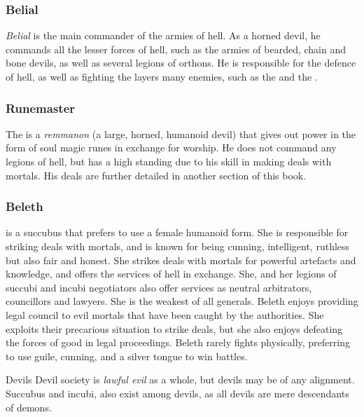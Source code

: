 \subsubsection{Belial}
\label{sec:Belial}

\emph{Belial} is the main commander of the armies of hell. As a horned devil,
he commands all the lesser forces of hell, such as the armies of bearded,
chain and bone devils, as well as several legions of orthons. He is
responsible for the defence of hell, as well as fighting the layers many
enemies, such as the  and the .

\subsubsection{Runemaster}

The  is a \emph{remmanon} (a large, horned, humanoid
devil) that gives out power in the form of soul magic runes in exchange for
worship. He does not command any legions of hell, but has a high standing due
to his skill in making deals with mortals. His deals are further detailed in
another section of this book.

\subsubsection{Beleth}
\label{sec:Beleth}

 is a succubus that prefers to use a female
humanoid form. She is responsible for striking deals with mortals, and is
known for being cunning, intelligent, ruthless but also fair and honest. She
strikes deals with mortals for powerful artefacts and knowledge, and offers
the services of hell in exchange. She, and her legions of succubi and incubi
negotiators also offer services as neutral arbitrators, councillors and
lawyers. She is the weakest of all generals. Beleth enjoys providing legal
council to evil mortals that have been caught by the authorities. She exploits
their precarious situation to strike deals, but she also enjoys defeating
the forces of good in legal proceedings. Beleth rarely fights physically,
preferring to use guile, cunning, and a silver tongue to win battles.

\begin{35e}{Devils}
  Devil society is \emph{lawful evil} as a whole, but devils may be of any
  alignment. Succubus and incubi, also exist among devils, as all devils are
  mere descendants of demons.
\end{35e}
